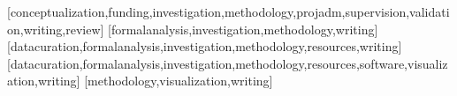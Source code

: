 \documentclass[portuguese]{textolivre}
\begin{document}
\begin{contributors}
[conceptualization,funding,investigation,methodology,projadm,supervision,validation,writing,review]
[formalanalysis,investigation,methodology,writing]
[datacuration,formalanalysis,investigation,methodology,resources,writing]
[datacuration,formalanalysis,investigation,methodology,resources,software,visualization,writing]
[methodology,visualization,writing]
\end{contributors}
\end{document}
